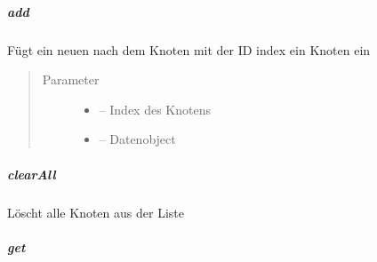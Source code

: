 \documentclass[letterpaper,10pt,ngerman]{sphinxmanual}
\begin{document}
\subparagraph{add}
\label{\detokenize{com/linuxluigi/edu/list/SinglyLinkedList:id1}}

\begin{fulllineitems}
\label{\detokenize{com/linuxluigi/edu/list/SinglyLinkedList:com.linuxluigi.edu.list.SinglyLinkedList.add(int, T)}}
Fügt ein neuen nach dem Knoten mit der ID index ein Knoten ein
\begin{quote}\begin{description}
\item[{Parameter}] \leavevmode\begin{itemize}
\item {} 
 -- Index des Knotens

\item {} 
 -- Datenobject

\end{itemize}

\end{description}\end{quote}

\end{fulllineitems}



\subparagraph{clearAll}
\label{\detokenize{com/linuxluigi/edu/list/SinglyLinkedList:clearall}}

\begin{fulllineitems}
\label{\detokenize{com/linuxluigi/edu/list/SinglyLinkedList:com.linuxluigi.edu.list.SinglyLinkedList.clearAll()}}
Löscht alle Knoten aus der Liste

\end{fulllineitems}



\subparagraph{get}
\label{\detokenize{com/linuxluigi/edu/list/SinglyLinkedList:get}}
\end{document}
